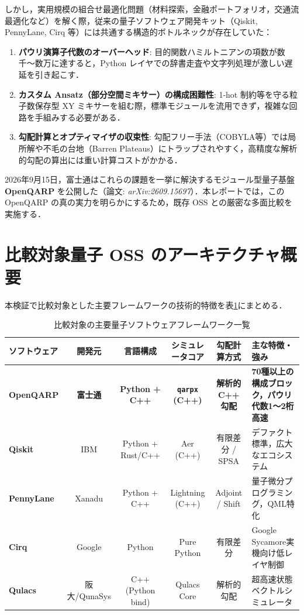 \documentclass[11pt,a4paper]{ltjsarticle}
\begin{document}
しかし，実用規模の組合せ最適化問題（材料探索，金融ポートフォリオ，交通流最適化など）を解く際，従来の量子ソフトウェア開発キット（Qiskit, PennyLane, Cirq 等）には共通する構造的ボトルネックが存在していた：
\begin{enumerate}\setlength{\itemsep}{1mm}
    \item \textbf{パウリ演算子代数のオーバーヘッド}: 目的関数ハミルトニアンの項数が数千〜数万に達すると，Python レイヤでの辞書走査や文字列処理が激しい遅延を引き起こす．
    \item \textbf{カスタム Ansatz（部分空間ミキサー）の構成困難性}: 1-hot 制約等を守る粒子数保存型 XY ミキサーを組む際，標準モジュールを流用できず，複雑な回路を手組みする必要がある．
    \item \textbf{勾配計算とオプティマイザの収束性}: 勾配フリー手法（COBYLA等）では局所解や不毛の台地（Barren Plateaus）にトラップされやすく，高精度な解析的勾配の算出には重い計算コストがかかる．
\end{enumerate}

2026年9月15日，富士通はこれらの課題を一挙に解決するモジュール型量子基盤 \textbf{OpenQARP} を公開した（論文: \textit{arXiv:2609.15697}）\cite{openqarp_paper}．本レポートでは，この OpenQARP の真の実力を明らかにするため，既存 OSS との厳密な多面比較を実施する．

\section{比較対象量子 OSS のアーキテクチャ概要}

本検証で比較対象とした主要フレームワークの技術的特徴を表\ref{tab:oss_comparison}にまとめる．

\begin{table}[H]
\centering
\small
\caption{比較対象の主要量子ソフトウェアフレームワーク一覧}
\label{tab:oss_comparison}
\vspace{1mm}
\begin{tabularx}{\textwidth}{lccccX}
\toprule
\textbf{ソフトウェア} & \textbf{開発元} & \textbf{言語構成} & \textbf{シミュレータコア} & \textbf{勾配計算方式} & \textbf{主な特徴・強み} \\
\midrule
\textbf{OpenQARP} & \textbf{富士通} & \textbf{Python + C++} & \textbf{\texttt{qarpx} (C++)} & \textbf{解析的 C++ 勾配} & \textbf{70種以上の構成ブロック，パウリ代数1〜2桁高速} \\
\textbf{Qiskit} & IBM & Python + Rust/C++ & Aer (C++) & 有限差分 / SPSA & デファクト標準，広大なエコシステム \\
\textbf{PennyLane} & Xanadu & Python + C++ & Lightning (C++) & Adjoint / Shift & 量子微分プログラミング，QML特化 \\
\textbf{Cirq} & Google & Python & Pure Python & 有限差分 & Google Sycamore実機向け低レイヤ制御 \\
\textbf{Qulacs} & 阪大/QunaSys & C++ (Python bind) & Qulacs Core & 解析的勾配 & 超高速状態ベクトルシミュレータ \\
\bottomrule
\end{tabularx}
\end{table}
\end{document}
